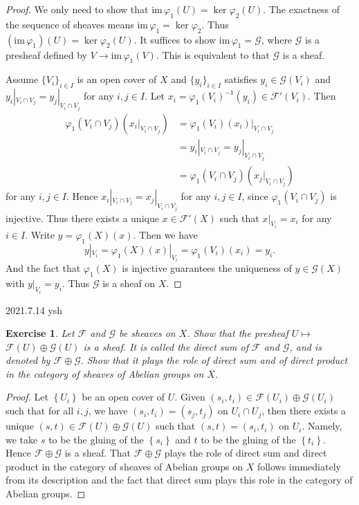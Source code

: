 \documentclass[12pt]{amsart}
\newtheorem{exe}{Exercise}[subsection]
\begin{document}
\begin{proof}
	We only need to show that $\mathrm{im}\,\varphi_1(U)=\ker\varphi_2(U)$. The exactness of the sequence of sheaves means $\mathrm{im}\,\varphi_1=\ker\varphi_2$. Thus $(\mathrm{im}\,\varphi_1)(U)=\ker\varphi_2(U)$. It suffices to show $\mathrm{im}\,\varphi_1=\mathscr{G}$, where $\mathscr{G}$ is a presheaf defined by $V\to\mathrm{im}\,\varphi_1(V)$. This is equivalent to that $\mathscr{G}$ is a sheaf.
	
	Assume $\{V_i\}_{i\in I}$ is an open cover of $X$ and $\{y_i\}_{i\in I}$ satisfies $y_i\in\mathscr{G}(V_i)$ and $y_i|_{V_i\cap V_j}=y_j|_{V_i\cap V_j}$ for any $i,j\in I$. Let $x_i=\varphi_1(V_i)^{-1}(y_i)\in\mathscr{F}'(V_i)$. Then 
	\begin{align*}
	\varphi_1(V_i\cap V_j)(x_i|_{V_i\cap V_j})&=\varphi_1(V_i)(x_i)|_{V_i\cap V_j}\\
	&=y_i|_{V_i\cap V_j}=y_j|_{V_i\cap V_j}\\
	&=\varphi_1(V_i\cap V_j)(x_j|_{V_i\cap V_j})
	\end{align*}
	for any $i,j\in I$. Hence $x_i|_{V_i\cap V_j}=x_j|_{V_i\cap V_j}$ for any $i,j\in I$, since $\varphi_1(V_i\cap V_j)$ is injective. Thus there exists a unique $x\in\mathscr{F}'(X)$ such that $x|_{V_i}=x_i$ for any $i\in I$. Write $y=\varphi_1(X)(x)$. Then we have $$y|_{V_i}=\varphi_1(X)(x)|_{V_i}=\varphi_1(V_i)(x_i)=y_i.$$ And the fact that $\varphi_1(X)$ is injective guarantees the uniqueness of $y\in\mathscr{G}(X)$ with $y|_{V_i}=y_i$. Thus $\mathscr{G}$ is a sheaf on $X$.
\end{proof}

2021.7.14 ysh
\begin{exe}
               Let $\mathscr{F}$ and $\mathscr{G}$ be sheaves on $X$. Show that the presheaf $U \mapsto$ $\mathscr{F}(U) \oplus \mathscr{G}(U)$ is a sheaf. It is called the direct sum of $\mathscr{F}$ and $\mathscr{G}$, and is denoted by $\mathscr{F} \oplus \mathscr{G} .$ Show that it plays the role of direct sum and of direct product in the category of sheaves of Abelian groups on $X$.
\end{exe}

\begin{proof}
               Let $\left\{U_{i}\right\}$ be an open cover of $U$. Given $\left(s_{i}, t_{i}\right) \in \mathscr{F}\left(U_{i}\right) \oplus \mathscr{G}\left(U_{i}\right)$ such that for all $i, j$, we have $\left(s_{i}, t_{i}\right)=\left(s_{j}, t_{j}\right)$ on $U_{i} \cap U_{j}$, then there exists a unique $(s, t) \in \mathscr{F}(U) \oplus \mathscr{G}(U)$ such that $(s, t)=\left(s_{i}, t_{i}\right)$ on $U_{i} .$ Namely, we take $s$ to be the gluing of the $\left\{s_{i}\right\}$ and $t$ to be the gluing of the $\left\{t_{i}\right\} .$ Hence $\mathscr{F} \oplus \mathscr{G}$ is a sheaf.    
               That $\mathscr{F} \oplus \mathscr{G}$ plays the role of direct sum and direct product in the category of sheaves of Abelian groups on $X$ follows immediately from its description and the fact that direct sum plays this role in the category of Abelian groups.
\end{proof}
\end{document}
